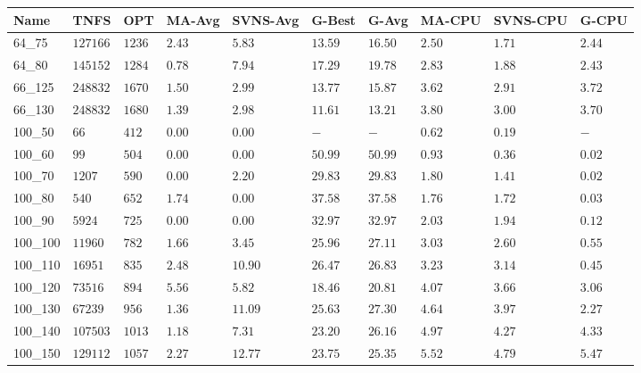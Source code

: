 \begin{center}
    \begin{table}[]
    \centering
    \begin{adjustwidth}{-0.4in}{-1in}
    \begin{tabular}{|lll|l|l|ll|lll|}
\hline
Name     & TNFS        & OPT    & MA-Avg & SVNS-Avg & G-Best & G-Avg & MA-CPU & SVNS-CPU & G-CPU \\
\hline
64\_75   & $127166   $ & $1236$ & $2.43$ & $5.83 $  & $13.59$    & $16.50$   & $2.50$ & $1.71 $  & $2.44$ \\
64\_80   & $145152   $ & $1284$ & $0.78$ & $7.94 $  & $17.29$    & $19.78$   & $2.83$ & $1.88 $  & $2.43$ \\
\hline
66\_125  & $248832   $ & $1670$ & $1.50$ & $2.99 $  & $13.77$    & $15.87$   & $3.62$ & $2.91 $  & $3.72$ \\
66\_130  & $248832   $ & $1680$ & $1.39$ & $2.98 $  & $11.61$    & $13.21$   & $3.80$ & $3.00 $  & $3.70$ \\
\hline
100\_50  & $66       $ & $412 $ & $\bm{0.00}$ & $\bm{0.00} $  & $-    $    & $-    $   & $0.62$ & $0.19 $  & $-   $ \\
100\_60  & $99       $ & $504 $ & $\bm{0.00}$ & $\bm{0.00} $  & $50.99$    & $50.99$   & $0.93$ & $0.36 $  & $0.02$ \\
100\_70  & $1207     $ & $590 $ & $\bm{0.00}$ & $2.20 $  & $29.83$    & $29.83$   & $1.80$ & $1.41 $  & $0.02$ \\
100\_80  & $540      $ & $652 $ & $1.74$ & $\bm{0.00} $  & $37.58$    & $37.58$   & $1.76$ & $1.72 $  & $0.03$ \\
100\_90  & $5924     $ & $725 $ & $\bm{0.00}$ & $\bm{0.00} $  & $32.97$    & $32.97$   & $2.03$ & $1.94 $  & $0.12$ \\
100\_100 & $11960    $ & $782 $ & $1.66$ & $3.45 $  & $25.96$    & $27.11$   & $3.03$ & $2.60 $  & $0.55$ \\
100\_110 & $16951    $ & $835 $ & $2.48$ & $10.90$  & $26.47$    & $26.83$   & $3.23$ & $3.14 $  & $0.45$ \\
100\_120 & $73516    $ & $894 $ & $5.56$ & $5.82 $  & $18.46$    & $20.81$   & $4.07$ & $3.66 $  & $3.06$ \\
100\_130 & $67239    $ & $956 $ & $1.36$ & $11.09$  & $25.63$    & $27.30$   & $4.64$ & $3.97 $  & $2.27$ \\
100\_140 & $107503   $ & $1013$ & $1.18$ & $7.31 $  & $23.20$    & $26.16$   & $4.97$ & $4.27 $  & $4.33$ \\
100\_150 & $129112   $ & $1057$ & $2.27$ & $12.77$  & $23.75$    & $25.35$   & $5.52$ & $4.79 $  & $5.47$ \\

\end{tabular}
\end{adjustwidth}
\end{table}
\end{center}

